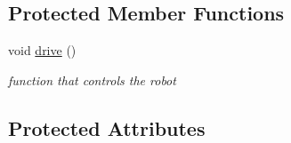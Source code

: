 \subsection*{Protected Member Functions}
\begin{DoxyCompactItemize}
\item 
\mbox{\label{class_omni_drive_conrtoller_a57c810f822a2fe5f49edad9ade0fb3eb}} 
void \mbox{\hyperlink{class_omni_drive_conrtoller_a57c810f822a2fe5f49edad9ade0fb3eb}{drive}} ()
\begin{DoxyCompactList}\small\item\em function that controls the robot \end{DoxyCompactList}\end{DoxyCompactItemize}
\subsection*{Protected Attributes}
